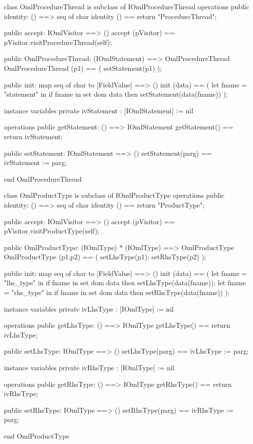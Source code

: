 \begin{vdm_al}
class OmlProcedureThread is subclass of IOmlProcedureThread
operations
  public identity: () ==> seq of char
  identity () == return "ProcedureThread";

  public accept: IOmlVisitor ==> ()
  accept (pVisitor) == pVisitor.visitProcedureThread(self);

  public OmlProcedureThread:
      (IOmlStatement) ==> OmlProcedureThread
  OmlProcedureThread (p1) == 
   ( setStatement(p1) );

  public init: map seq of char to [FieldValue] ==> ()
  init (data) ==
    ( let fname = "statement" in
        if fname in set dom data
        then setStatement(data(fname)) );

instance variables
  private ivStatement : [IOmlStatement] := nil

operations
  public getStatement: () ==> IOmlStatement
  getStatement() == return ivStatement;

  public setStatement: IOmlStatement ==> ()
  setStatement(parg) == ivStatement := parg;

end OmlProcedureThread
\end{vdm_al}

\begin{vdm_al}
class OmlProductType is subclass of IOmlProductType
operations
  public identity: () ==> seq of char
  identity () == return "ProductType";

  public accept: IOmlVisitor ==> ()
  accept (pVisitor) == pVisitor.visitProductType(self);

  public OmlProductType:
      (IOmlType) *
      (IOmlType) ==> OmlProductType
  OmlProductType (p1,p2) == 
   ( setLhsType(p1);
     setRhsType(p2) );

  public init: map seq of char to [FieldValue] ==> ()
  init (data) ==
    ( let fname = "lhs_type" in
        if fname in set dom data
        then setLhsType(data(fname));
      let fname = "rhs_type" in
        if fname in set dom data
        then setRhsType(data(fname)) );

instance variables
  private ivLhsType : [IOmlType] := nil

operations
  public getLhsType: () ==> IOmlType
  getLhsType() == return ivLhsType;

  public setLhsType: IOmlType ==> ()
  setLhsType(parg) == ivLhsType := parg;

instance variables
  private ivRhsType : [IOmlType] := nil

operations
  public getRhsType: () ==> IOmlType
  getRhsType() == return ivRhsType;

  public setRhsType: IOmlType ==> ()
  setRhsType(parg) == ivRhsType := parg;

end OmlProductType
\end{vdm_al}

